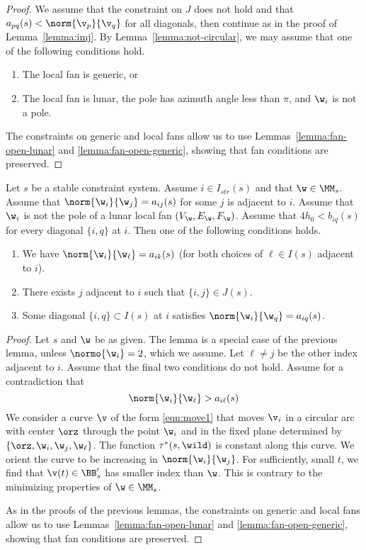 \begin{proof} We assume that the constraint on $J$ does not hold and
that $a_{p q}(s)<\norm{\v_p}{\v_q}$ for all diagonals, then continue as in the proof of
Lemma~\ref{lemma:imj}.
By Lemma~\ref{lemma:not-circular}, we may assume that one of the
following
conditions hold.
\begin{enumerate}
\item The local fan is generic, or
\item The local fan is lunar, the pole has azimuth
angle less than $\pi$, and $\w_i$ is not a pole.  
\end{enumerate}
The constraints on generic and local fans
allow us to use Lemmas~\ref{lemma:fan-open-lunar} and
\ref{lemma:fan-open-generic}, showing that fan conditions are preserved.
\end{proof}

\begin{lemma}\label{lemma:nux2}
Let $s$ be a stable constraint system.  Assume $i\in I_{str}(s)$
and that $\w\in \MM_s$.   
Assume that $\norm{\w_i}{\w_j}=a_{ij}(s)$ for
some $j$ is adjacent to $i$.  
Assume  that $\w_i$ is not the pole of a lunar local fan $(V_\w,E_\w,F_\w)$.
Assume that $4h_0 < b_{iq}(s)$ for every diagonal $\{i,q\}$ at $i$.
Then
one of the following conditions holds.
\begin{enumerate}
\item We have $\norm{\w_i}{\w_\ell}=a_{ik}(s)$
(for both choices of $\ell\in I(s)$ adjacent to $i$).
\item There exists $j$ adjacent to $i$ such that $\{i,j\}\in J(s)$.
\item Some diagonal $\{i,q\}\subset I(s)$ at $i$ satisfies
$\norm{\w_i}{\w_q}=a_{i q}(s)$.
\end{enumerate}
\end{lemma}

\begin{proof} 
Let $s$ and $\w$ be as given.  The lemma is a special
case of the previous lemma, unless $\normo{\w_i}=2$, which we assume.
Let $\ell\ne j$ be the other index adjacent to $i$.
Assume that the final
two conditions do not hold.
Assume for a contradiction that 
\[
\norm{\w_i}{\w_\ell}>a_{i \ell}(s)
\]
We consider a curve $\v$ of the form \eqref{eqn:move1} that moves $\v_i$
in a circular arc with center $\orz$ through the point $\w_i$ and in
the fixed plane determined by $\{\orz,\w_i,\w_j,\w_{\ell}\}$.  
The function $\tau^*(s,\wild)$ is
constant along this curve.  We orient the curve to be increasing
in $\norm{\w_i}{\w_{j}}$.  For sufficiently, small $t$, we find that
$\v(t)\in\BB'_s$ has smaller index than $\w$.  This is contrary to the minimizing
properties of $\w\in\MM_s$.

As in the proofs of the previous lemmas, the constraints on generic and local fans
allow us to use Lemmas~\ref{lemma:fan-open-lunar} and
\ref{lemma:fan-open-generic}, showing that fan conditions are preserved.
\end{proof}

